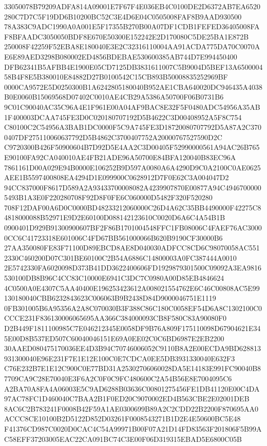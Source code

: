 \documentclass[UTF8,fontset=fandol,zihao=-4,a4paper]{ctexart}
\begin{document}
{{33050078B79209ADFA814A09001E7F67F4E036EB4C0100DE2D6372AB7EA6520280C7D7C5F19DD6B10200BC52C3E4D6E04C0505008FAF8B9AAD930500
78A383C9ADC1990A0A001E5F17355B270B00A07DF1CDB1FEFED36405008FAF8BFAADC3050050BDF8E670E50300E152242E2D170080C5DE25BA1E872B
250008F42259F52EBA8E180040E3E2C32316110004AA91ACDA775DA70C0070AE6E89AED3298B080002ED4856BDEBAE530600385AB744D7E994450400
DFB62341B5AFBB4E1900E05CD7125DB3831611007C5B9004D5BEF13A650000458B4F8E5B380010E84882D27B0100542C15CB893B50008835252969BF
0000CA9572E5D0250300B1A6242805180040B952AE1CBA640020DC946435A4038B0E0060B15069568D07402C0010AE4CB29A5386A50700F06B0731B6
9C01C90040AC35C96A4E1F961E00A04AF9BAC8E32F5F0480ADC54956A35AB1F400003DCAA745FE3D0C020180707192D5B4622C3D00408952A5F8C754
C80100C2C54956A3BAB1DC0000F5C9A745FE3D18720080707792D5A87A2C3700407DF275110060637792D5B4862C3700407752A20000767527590D2C
C9720300B426F50900604B7D92D5E4AA2C3D00405F52990000561A94AC26B765E90100FA92CA040010AE4FB21ADE96A50700E84BFA120040B83EC96A
7861161D00A029E94B0000E106252B9D597A0080A6A4290D9C0A2100C0AE0625AEE1B5597400808EA4294D1E099900C0628912D7F0E62C3A004047D2
94CC837000F8617D589A2A93433700008082A4239907870E00877A94C49467000005493B1A3E0F220280708F92D8F0FE6C060000D5482F320F520280
708F12DAF00A6D0C0000BD48233212060000C26D4A62C35BB4490000F42275C84818000088B52971E9D2E60100D088142123610C0020D6A6C4A54B1B
0900401D929B91300900607BF2F86B1701004548FFC1FB08006C4FAEF76AC30000CC6C41723318E601006C4FD67BB561000066B620B9190CF30000B6
27AA350080FE83F71100D89EBCD8AE8D040030ADFCC8CD6C98070058AC5512330C460200D07C301BE60100C2B54A6886C14800003A0FC387444A0010
2E5742330FA6020098D373B41DD3622400606FD1929879301500C09092A3EA9816530100DB8B96C4CC83C10000E6941C3DC7C0980A00D85EB4846624
4C0500A0E4307C5AA40400E196253423612A008021554762E6C46C00808AC5E99130180040CBB6232843623C006063B9B2438D84D9000046751E1119
0FB301005B6A95356A2A8C070030B3F388C86C180C0058EF54D6A8C1302100C0CCCE231F836130006065695AA366C384000093CB8F580C83A90080F0
D2B449F1811100985C7E046212345E0058DF9B76A809F175110098D67904621E345E00D8B537ED507C60040046151E69A0EE02C0C6BD6987E2EB2200
30AAED080475170036EE4D3B94C70746006052C9110B8A2E00ECDA9BD628813931300040E96E231F7E1E12E100C0E7CDCA0EE5DB3931330040E632F3
C76E232B7E1E12C900C0E77BD31A25302706060028DA5E14183E991FC90040B87709CA9C28E70040E3F6A2C0F0C9FC480600C2A54B56E8E7004095C6
A2BA70A8FA4A06003E5C9AD6288B03636C00801275456FE1DB41120E00C4DA97AC78FC1D460040C7BAA2B1F0ED20C9070002ED4B563CBE2E02001DEB
8AC6C2B783241F0008B42F59A1AE0300699B89A2C2CDD22B2200F870695AA0ACCC8CE10100B2D5122D852D03261F0008543271B1D2E4E50600BC5E48
F41376CD987C0020D0CAC4C54A99971B00F07A21D14FD83563F201806F5B99AC58EFF37203005EAC22CA091BC74C3E00F06D319315EBAD5E6800C05B
}}
\end{document}
